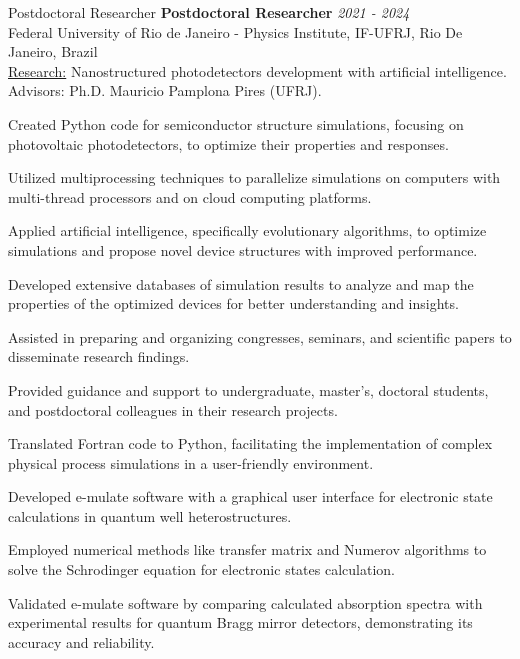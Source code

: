 \documentclass{resume} %
\begin{document}
\begin{rSection}{Postdoctoral Researcher}
        {\bf Postdoctoral Researcher} \hfill {\em 2021 - 2024} \\ 
        {\normalfont Federal University of Rio de Janeiro - Physics Institute, IF-UFRJ, Rio De Janeiro, Brazil}\\
        \underline{Research:} {\normalfont Nanostructured photodetectors development with artificial intelligence.} \\
        Advisors: Ph.D. Mauricio Pamplona Pires (UFRJ).
        \begin{rSubsection}{}{}{}{}
            {\normalfont 
                \item Created Python code for semiconductor structure simulations, focusing on photovoltaic photodetectors, to optimize their properties and responses.
                \item Utilized multiprocessing techniques to parallelize simulations on computers with multi-thread processors and on cloud computing platforms.
                \item Applied artificial intelligence, specifically evolutionary algorithms, to optimize simulations and propose novel device structures with improved performance.
                \item Developed extensive databases of simulation results to analyze and map the properties of the optimized devices for better understanding and insights.
                \item Assisted in preparing and organizing congresses, seminars, and scientific papers to disseminate research findings.
                \item Provided guidance and support to undergraduate, master's, doctoral students, and postdoctoral colleagues in their research projects.
                \item Translated Fortran code to Python, facilitating the implementation of complex physical process simulations in a user-friendly environment.
                \item Developed e-mulate software with a graphical user interface for electronic state calculations in quantum well heterostructures.
                \item Employed numerical methods like transfer matrix and Numerov algorithms to solve the Schrodinger equation for electronic states calculation.
                \item Validated e-mulate software by comparing calculated absorption spectra with experimental results for quantum Bragg mirror detectors, demonstrating its accuracy and reliability.
            }
        \end{rSubsection}

    \end{rSection}
    
\end{document}
